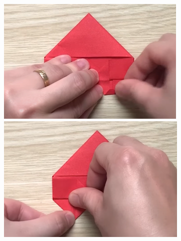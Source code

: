 \begin{multicols}{2}
\begin{figure}[H]
			\vspace*{1pt}
			\includegraphics[height= 0.327\linewidth]{39}
			\includegraphics[height= 0.327\linewidth]{40}
			

\end{figure}
\end{multicols}
